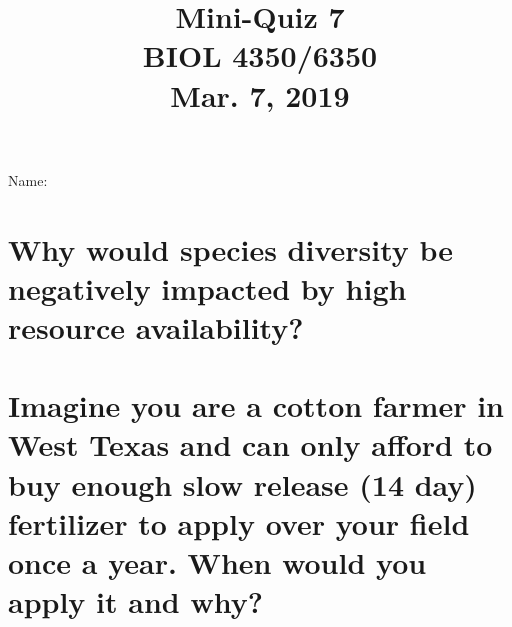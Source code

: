 \documentclass[12pt, notitlepage]{article}   	%
\title{
	\textbf{
		Mini-Quiz 7
	} \\
	\large BIOL 4350/6350 \\
	\large Mar. 7, 2019 \\
}
\date{\vspace{-5ex}}
\def\wl{\par \vspace{\baselineskip}}
\begin{document}
{\selectfont %

\large{Name:}

{\let\newpage\relax\maketitle}

\section{\small{Why would species diversity be negatively impacted by high resource
availability?}}
\wl
\wl
\wl
\wl
\wl
\wl
\wl
\wl
\wl
\wl


\newpage

\section{\small{Imagine you are a cotton farmer in West Texas and can only afford to
buy enough slow release (14 day) fertilizer to apply over your field once a year.
When would you apply it and why?}}

} %
\end{document}
